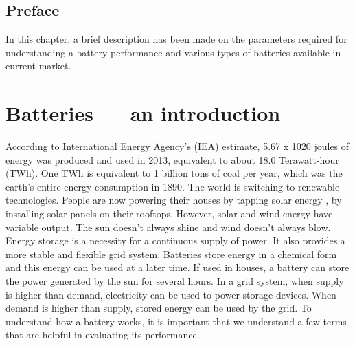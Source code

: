 \section*{Preface}
In this chapter, a brief description has been made on the parameters required for understanding a battery performance and various types of batteries available in current market.
\pagebreak
\chapter{Batteries --- an introduction} %
 \label{chap1} %
\newcommand{\keyword}[1]{\textbf{#1}}
\newcommand{\tabhead}[1]{\textbf{#1}}
\newcommand{\code}[1]{\texttt{#1}}
\newcommand{\file}[1]{\texttt{\bfseries#1}}
\newcommand{\option}[1]{\texttt{\itshape#1}}

According to International Energy Agency's (IEA) estimate, 5.67 x 1020 joules of energy was produced and used in 2013, equivalent to about 18.0 Terawatt-hour (TWh). One TWh is equivalent to 1 billion tons of coal per year, which was the earth's entire energy consumption in 1890. The world is switching to renewable technologies. People are now powering their houses by tapping solar energy , by installing solar panels on their rooftops. However, solar and wind energy have variable output. The sun doesn't always shine and wind doesn't always blow. Energy storage is a necessity for a continuous supply of power. It also provides a more stable and flexible grid system. Batteries store energy in a chemical form and this energy can be used at a later time. If used in houses, a battery can store the power generated by the sun for several hours. In a grid system, when supply is higher than demand, electricity can be used to power storage devices. When demand is higher than supply, stored energy can be used by the grid. To understand how a battery works, it is important that we understand a few terms that are helpful in evaluating its performance. 

